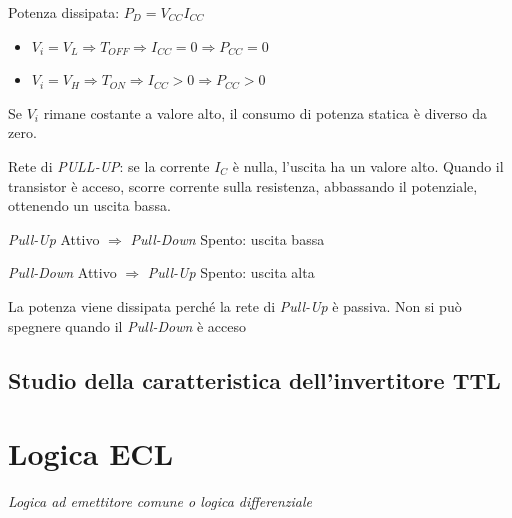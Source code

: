 \documentclass{article}
\begin{document}
Potenza dissipata: $P_{D} = V_{CC} I_{CC}$

\begin{itemize}
    \item $V_i = V_L \Rightarrow T_{OFF} \Rightarrow I_{CC} = 0 \Rightarrow  P_{CC} = 0$

    \item $V_i = V_H \Rightarrow T_{ON} \Rightarrow I_{CC} > 0 \Rightarrow P_{CC} > 0$
\end{itemize}

Se $V_i$ rimane costante a valore alto, il consumo di potenza statica è diverso da zero.

Rete di \textit{PULL-UP}: se la corrente $I_C$ è nulla, l'uscita ha un valore alto.
Quando il transistor è acceso, scorre corrente sulla resistenza, abbassando il potenziale, ottenendo un uscita bassa.

\textit{Pull-Up} Attivo $\Rightarrow$ \textit{Pull-Down} Spento: uscita bassa

\textit{Pull-Down} Attivo $\Rightarrow$ \textit{Pull-Up} Spento: uscita alta


La potenza viene dissipata perché la rete di \textit{Pull-Up} è passiva. Non si può spegnere quando il \textit{Pull-Down} è acceso


\subsection{Studio della caratteristica dell'invertitore TTL}

\section{Logica ECL}
\textit{Logica ad emettitore comune o logica differenziale}

\end{document}
